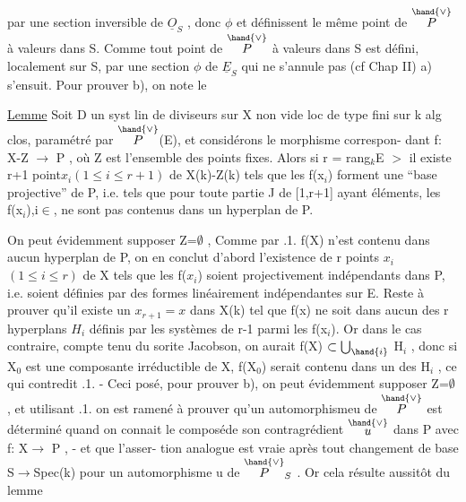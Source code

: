 
par une section inversible de $\underline{O}_S$ , donc $\phi$ et \unsure{$\psi$} définissent le même point
de $\overset{\hand{\vee}}{P}$ à valeurs dans S. Comme tout point de $\overset{\hand{\vee}}{P}$ à valeurs dans S est défini,
localement sur S, par une section $\phi$ de $\underline{E}_S$ qui ne s'annule pas (cf Chap II)
a) s'ensuit.   Pour prouver b), on note le

\uline{Lemme}   Soit D un syst lin de diviseurs sur X non vide loc de type fini
sur k alg clos, paramétré par $\overset{\hand{\vee}}{P}$(E), et considérons le morphisme correspon-%
dant  f: X-Z $\longrightarrow$ P , où Z est l'ensemble des points fixes. Alors  si
r = rang$_k$E $>$ il existe  r+1 point$x_i$$(1\leq i\leq r+1)$ de  X(k)-Z(k)  tels que les
f(x$_i$) forment une  ``base projective'' de P, i.e. tels que  pour toute
partie J de [1,r+1] ayant   éléments,  les  f(x$_i$),i$\in$,  ne sont pas
contenus dans un hyperplan de P.

On peut évidemment supposer Z=$\emptyset$ ,   Comme par .1. f(X) n'est contenu dans
aucun hyperplan de P, on en conclut d'abord l'existence de r points
$x_i$$(1\leq i\leq r)$ de X tels que les f($x_i$) soient projectivement indépendants dans P, i.e. soient définies
par des formes linéairement indépendantes sur E.   Reste à prouver qu'il
existe un  $x_{r+1} = x$   dans X(k) tel que  f(x) ne soit dans aucun des r
hyperplans $H_i$ définis par les  systèmes de r-1 parmi les f(x$_i$). Or dans
le cas contraire, compte tenu du sorite Jacobson,  on aurait
f(X) $\subset \bigcup_{\hand{i}}$ H$_i$ , donc  si X$_0$  est une composante
irréductible de X, f(X$_0$) serait contenu dans un des H$_i$ , ce qui contredit
.1. - Ceci posé,  pour prouver b), on peut  évidemment supposer Z=$\emptyset$ ,
et utilisant .1.  on est ramené à prouver qu'un automorphismeu de $\overset{\hand{\vee}}{P}$ est
déterminé quand on connait le composéde son contragrédient $\overset{\hand{\vee}}{u}$ dans P avec f: X$\longrightarrow$ P , - et que l'asser-%
tion analogue est vraie après tout changement de base S$\rightarrow$Spec(k)
pour un  automorphisme u de $\overset{\hand{\vee}}{P}_S$  .  Or cela résulte aussitôt  du lemme

